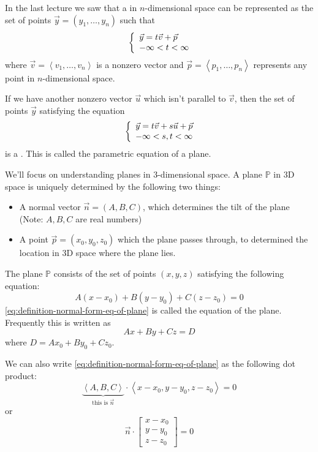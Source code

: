 \documentclass[10pt]{article}
\theoremstyle{definition}
\newcommand{\1}[1]{\textbf{1}_{\left[#1\right]}} %
\def\P{\mathbb{P}} %
\newcommand{\dempfcolor}[1]{{\color{RoyalBlue}#1}}
\newcommand{\demph}[1]{\dempfcolor{{\sl #1}}}
\begin{document}
In the last lecture we saw that a \demph{line} in $n$-dimensional space can be represented as the set of points
$\vec{y}=(y_{1},\ldots,y_{n})$ such that
\begin{equation*}
  \left\{ \begin{array}{l@{}l} \vec{y}=t \vec{v}+\vec{p} \\
      -\infty<t<\infty  \end{array}\right.
\end{equation*}
where $\vec{v}=\left\langle v_{1},\ldots,v_{n} \right\rangle $ is a nonzero vector and
$\vec{p}=\left\langle p_{1},\ldots,p_{n} \right\rangle $ represents any point in $n$-dimensional space.


If we have another nonzero vector $\vec{u}$ which isn't parallel to $\vec{v}$, then the set of points
$\vec{y}$ satisfying the equation
\begin{equation}\label{eq:definition-of-parametric-form-eq-of-plane}
  \left\{ \begin{array}{l@{}l} \vec{y}=t \vec{v}+ s\vec{u}+\vec{p} \\
      -\infty<s,t<\infty \end{array}\right.
\end{equation}
is a \demph{plane}. This is called the parametric equation of a plane.

We'll focus on understanding planes in 3-dimensional space. A plane $\P$ in 3D space is uniquely
determined by the following two things:
\begin{itemize}
  \item A normal vector $\vec{n} = (A,B,C)$, which determines the tilt of the
  plane (Note: $A,B,C$ are real numbers)
  \item A point $\vec{p}=(x_{0},y_{0},z_{0})$ which the plane passes through, to
  determined the location in 3D space where the plane lies.
\end{itemize}
The plane $\P$ consists of the set of points $(x,y,z)$ satisfying the following
equation:
\begin{equation}\label{eq:definition-normal-form-eq-of-plane}
  A(x-x_{0}) + B(y-y_{0})+C(z-z_{0})=0
\end{equation}
\cref{eq:definition-normal-form-eq-of-plane} is called the \demph{normal form} equation of the plane.
Frequently this is written as
\begin{equation*}
  Ax+By+Cz=D
\end{equation*}
where $D = Ax_{0}+By_{0}+Cz_{0}$.

We can also write \cref{eq:definition-normal-form-eq-of-plane} as the following dot product:
\begin{equation*}
  \underbrace{\left\langle A,B,C \right\rangle}_{\text{this is }\vec{n}} \cdot \left\langle x-x_{0},y-y_{0},z-z_{0} \right\rangle  =0
\end{equation*}
or
\begin{equation*}
  \vec{n}\cdot
  \begin{bmatrix}
    x-x_{0}\\y-y_{0}\\z-z_{0}
  \end{bmatrix}
  =0
\end{equation*}
\end{document}
